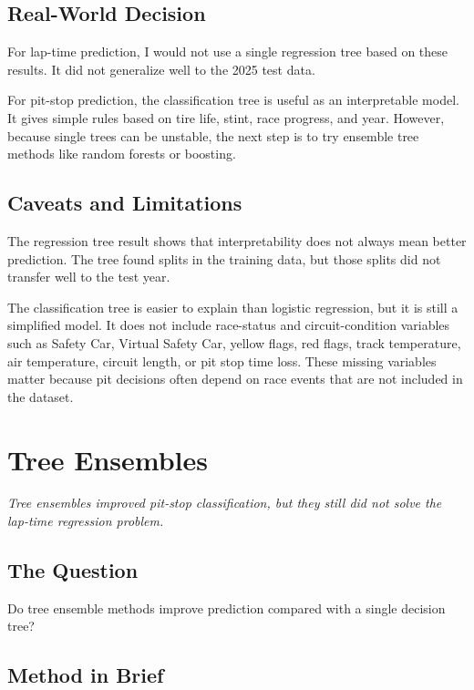 \documentclass[11pt,oneside,openany]{book}
\newcommand{\chapterquote}[1]{%
\begin{center}
\small\textit{#1}
\end{center}
\vspace{-0.5em}
}
\begin{document}
\section{Real-World Decision}

For lap-time prediction, I would not use a single regression tree based on these results. It did not generalize well to the 2025 test data.

For pit-stop prediction, the classification tree is useful as an interpretable model. It gives simple rules based on tire life, stint, race progress, and year. However, because single trees can be unstable, the next step is to try ensemble tree methods like random forests or boosting.

\section{Caveats and Limitations}

The regression tree result shows that interpretability does not always mean better prediction. The tree found splits in the training data, but those splits did not transfer well to the test year.

The classification tree is easier to explain than logistic regression, but it is still a simplified model. It does not include race-status and circuit-condition variables such as Safety Car, Virtual Safety Car, yellow flags, red flags, track temperature, air temperature, circuit length, or pit stop time loss. These missing variables matter because pit decisions often depend on race events that are not included in the dataset.



\chapter{Tree Ensembles}
\chapterquote{Tree ensembles improved pit-stop classification, but they still did not solve the lap-time regression problem.}

\section{The Question}

Do tree ensemble methods improve prediction compared with a single decision tree?

\section{Method in Brief}
\end{document}
